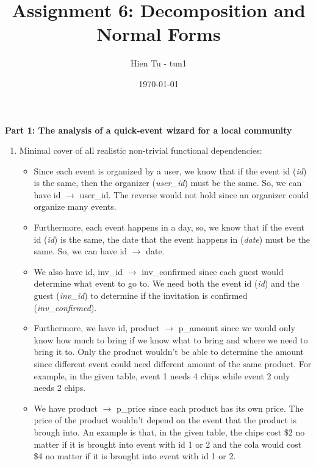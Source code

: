 \documentclass[12pt]{article}
\title{Assignment 6: Decomposition and Normal Forms}
\author{Hien Tu - tun1}
\date{\today}
\begin{document}
\maketitle

\textbf{Part 1: The analysis of a quick-event wizard for a local community}
\begin{enumerate}
  \item Minimal cover of all realistic non-trivial functional dependencies:
        \begin{itemize}
          \item Since each event is organized by a user, we know that if the
                event id (\emph{id}) is the same, then the organizer
                (\emph{user\_id}) must be the same. So, we can have id
                $\longrightarrow$ user\_id. The reverse would not hold since an
                organizer could organize many events.
          \item Furthermore, each event happens in a day, so, we know that if
                the event id (\emph{id}) is the same, the date that the event
                happens in (\emph{date}) must be the same. So, we can have id
                $\longrightarrow$ date.
          \item We also have id, inv\_id $\longrightarrow$ inv\_confirmed since
                each guest would determine what event to go to. We need both the
                event id (\emph{id}) and the guest (\emph{inv\_id}) to determine
                if the invitation is confirmed (\emph{inv\_confirmed}).
          \item Furthermore, we have id, product $\longrightarrow$ p\_amount
                since we would only know how much to bring if we know what to
                bring and where we need to bring it to. Only the product
                wouldn't be able to determine the amount since different event
                could need different amount of the same product. For example, in
                the given table, event 1 needs 4 chips while event 2 only needs
                2 chips.
          \item We have product $\longrightarrow$ p\_price since each product
                has its own price. The price of the product wouldn't depend on
                the event that the product is brough into. An example is that,
                in the given table, the chips cost \$2 no matter if it is
                brought into event with id 1 or 2 and the cola would cost \$4 no
                matter if it is brought into event with id 1 or 2.
        \end{itemize}


\end{enumerate}
\end{document}
